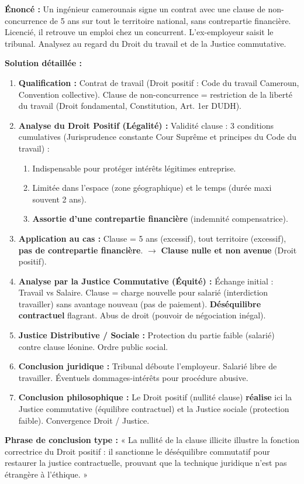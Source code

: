 \documentclass[11pt]{article}
\newcommand{\cle}[1]{{\popxbold\color{popdark}#1}}
\begin{document}
\begin{exoresolu}
\textbf{Énoncé :} Un ingénieur camerounais signe un contrat avec une clause de non-concurrence de 5 ans sur tout le territoire national, sans contrepartie financière. Licencié, il retrouve un emploi chez un concurrent. L'ex-employeur saisit le tribunal. Analysez au regard du Droit du travail et de la Justice commutative.

\tcblower
\textbf{Solution détaillée :}
\begin{enumerate}
    \item \textbf{Qualification :} Contrat de travail (Droit positif : Code du travail Cameroun, Convention collective). Clause de non-concurrence = restriction de la \cle{liberté du travail} (Droit fondamental, Constitution, Art. 1er DUDH).
    \item \textbf{Analyse du Droit Positif (Légalité) :} Validité clause : 3 conditions cumulatives (Jurisprudence constante Cour Suprême et principes du Code du travail) :
    \begin{enumerate}
        \item Indispensable pour protéger intérêts légitimes entreprise.
        \item Limitée dans l'espace (zone géographique) et le temps (durée maxi souvent 2 ans).
        \item \textbf{Assortie d'une \cle{contrepartie financière}} (indemnité compensatrice).
    \end{enumerate}
    \item \textbf{Application au cas :} Clause = 5 ans (excessif), tout territoire (excessif), \textbf{pas de contrepartie financière}. $\rightarrow$ \textbf{Clause nulle et non avenue} (Droit positif).
    \item \textbf{Analyse par la Justice Commutative (Équité) :} Échange initial : Travail vs Salaire. Clause = charge nouvelle pour salarié (interdiction travailler) sans avantage nouveau (pas de paiement). \textbf{Déséquilibre contractuel} flagrant. Abus de droit (pouvoir de négociation inégal).
    \item \textbf{Justice Distributive / Sociale :} Protection du partie faible (salarié) contre clause léonine. Ordre public social.
    \item \textbf{Conclusion juridique :} Tribunal déboute l'employeur. Salarié libre de travailler. Éventuels dommages-intérêts pour procédure abusive.
    \item \textbf{Conclusion philosophique :} Le Droit positif (nullité clause) \textbf{réalise} ici la Justice commutative (équilibre contractuel) et la Justice sociale (protection faible). Convergence Droit / Justice.
\end{enumerate}
\textbf{Phrase de conclusion type :} « La nullité de la clause illicite illustre la fonction correctrice du Droit positif : il sanctionne le déséquilibre commutatif pour restaurer la justice contractuelle, prouvant que la technique juridique n'est pas étrangère à l'éthique. »
\end{exoresolu}
\end{document}
